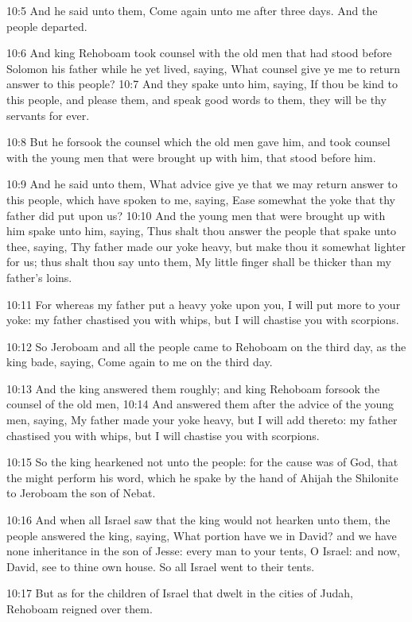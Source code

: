 10:5 And he said unto them, Come again unto me after three days. And
the people departed.

10:6 And king Rehoboam took counsel with the old men that had stood
before Solomon his father while he yet lived, saying, What counsel
give ye me to return answer to this people?  10:7 And they spake unto
him, saying, If thou be kind to this people, and please them, and
speak good words to them, they will be thy servants for ever.

10:8 But he forsook the counsel which the old men gave him, and took
counsel with the young men that were brought up with him, that stood
before him.

10:9 And he said unto them, What advice give ye that we may return
answer to this people, which have spoken to me, saying, Ease somewhat
the yoke that thy father did put upon us?  10:10 And the young men
that were brought up with him spake unto him, saying, Thus shalt thou
answer the people that spake unto thee, saying, Thy father made our
yoke heavy, but make thou it somewhat lighter for us; thus shalt thou
say unto them, My little finger shall be thicker than my father's
loins.

10:11 For whereas my father put a heavy yoke upon you, I will put more
to your yoke: my father chastised you with whips, but I will chastise
you with scorpions.

10:12 So Jeroboam and all the people came to Rehoboam on the third
day, as the king bade, saying, Come again to me on the third day.

10:13 And the king answered them roughly; and king Rehoboam forsook
the counsel of the old men, 10:14 And answered them after the advice
of the young men, saying, My father made your yoke heavy, but I will
add thereto: my father chastised you with whips, but I will chastise
you with scorpions.

10:15 So the king hearkened not unto the people: for the cause was of
God, that the \LORD might perform his word, which he spake by the hand
of Ahijah the Shilonite to Jeroboam the son of Nebat.

10:16 And when all Israel saw that the king would not hearken unto
them, the people answered the king, saying, What portion have we in
David?  and we have none inheritance in the son of Jesse: every man to
your tents, O Israel: and now, David, see to thine own house. So all
Israel went to their tents.

10:17 But as for the children of Israel that dwelt in the cities of
Judah, Rehoboam reigned over them.

